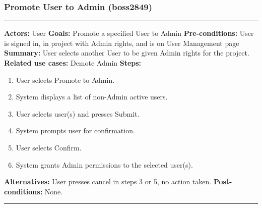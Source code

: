 \documentclass[11pt]{report}
\begin{document}
\subsubsection{Promote User to Admin  (boss2849)}
\vspace{2pt}
\hrule
\vspace{8pt}
 \textbf{Actors:} User \newline
\textbf{Goals:} Promote a specified User to Admin \newline
 \textbf{Pre-conditions:} User is signed in, in project with Admin rights, and is on User Management page \newline
 \textbf{Summary:} User selects another User to be given Admin rights for the project. \newline
\textbf{Related use cases:} Demote Admin \newline
\textbf{Steps:} \begin{enumerate}
  \item User selects Promote to Admin.
  \item System displays a list of non-Admin active users.
  \item User selects user(s) and presses Submit.
  \item System prompts user for confirmation.
  \item User selects Confirm.
  \item System grants Admin permissions to the selected user(s).
 \end{enumerate}
 \textbf{Alternatives:} User presses cancel in steps 3 or 5, no action taken. \newline
 \textbf{Post-conditions:} None. \newline
\vspace{8pt}
\hrule
\newpage
\end{document}
